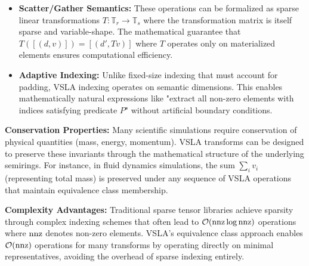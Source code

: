 \begin{itemize}
\item \textbf{Scatter/Gather Semantics:} These operations can be formalized as sparse linear transformations $T: \mathbb{T}_r \to \mathbb{T}_s$ where the transformation matrix is itself sparse and variable-shape. The mathematical guarantee that $T([(d,v)]) = [(d', Tv)]$ where $T$ operates only on materialized elements ensures computational efficiency.

\item \textbf{Adaptive Indexing:} Unlike fixed-size indexing that must account for padding, VSLA indexing operates on semantic dimensions. This enables mathematically natural expressions like "extract all non-zero elements with indices satisfying predicate $P$" without artificial boundary conditions.
\end{itemize}

\textbf{Conservation Properties:} Many scientific simulations require conservation of physical quantities (mass, energy, momentum). VSLA transforms can be designed to preserve these invariants through the mathematical structure of the underlying semirings. For instance, in fluid dynamics simulations, the sum $\sum_i v_i$ (representing total mass) is preserved under any sequence of VSLA operations that maintain equivalence class membership.

\textbf{Complexity Advantages:} Traditional sparse tensor libraries achieve sparsity through complex indexing schemes that often lead to $\mathcal{O}(\operatorname{nnz} \log \operatorname{nnz})$ operations where $\operatorname{nnz}$ denotes non-zero elements. VSLA's equivalence class approach enables $\mathcal{O}(\operatorname{nnz})$ operations for many transforms by operating directly on minimal representatives, avoiding the overhead of sparse indexing entirely.
